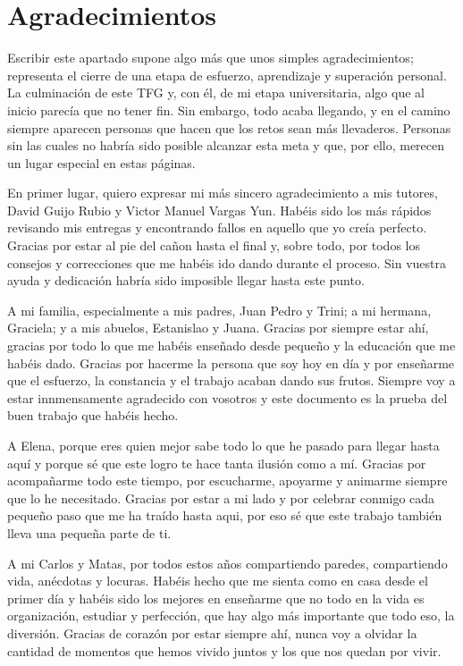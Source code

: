 \newpage
\section*{Agradecimientos}
\vspace{1cm}

Escribir este apartado supone algo más que unos simples agradecimientos; representa el cierre de una etapa de esfuerzo, aprendizaje y superación personal. La culminación de este TFG y, con él, de mi etapa universitaria, algo que al inicio parecía que no tener fin. Sin embargo, todo acaba llegando, y en el camino siempre aparecen personas que hacen que los retos sean más llevaderos. Personas sin las cuales no habría sido posible alcanzar esta meta y que, por ello, merecen un lugar especial en estas páginas.

En primer lugar, quiero expresar mi más sincero agradecimiento a mis tutores, David Guijo Rubio y Victor Manuel Vargas Yun. Habéis sido los más rápidos revisando mis entregas y encontrando fallos en aquello que yo creía perfecto. Gracias por estar al pie del cañon hasta el final y, sobre todo, por todos los consejos y correcciones que me habéis ido dando durante el proceso. Sin vuestra ayuda y dedicación habría sido imposible llegar hasta este punto.

A mi familia, especialmente a mis padres, Juan Pedro y Trini; a mi hermana, Graciela; y a mis abuelos, Estanislao y Juana. Gracias por siempre estar ahí, gracias por todo lo que me habéis enseñado desde pequeño y la educación que me habéis dado. Gracias por hacerme la persona que soy hoy en día y por enseñarme que el esfuerzo, la constancia y el trabajo acaban dando sus frutos. Siempre voy a estar innmensamente agradecido con vosotros y este documento es la prueba del buen trabajo que habéis hecho.

A Elena, porque eres quien mejor sabe todo lo que he pasado para llegar hasta aquí y porque sé que este logro te hace tanta ilusión como a mí. Gracias por acompañarme todo este tiempo, por escucharme, apoyarme y animarme siempre que lo he necesitado. Gracias por estar a mi lado y por celebrar conmigo cada pequeño paso que me ha traído hasta aqui, por eso sé que este trabajo también lleva una pequeña parte de ti.

A mi Carlos y Matas, por todos estos años compartiendo paredes, compartiendo vida, anécdotas y locuras. Habéis hecho que me sienta como en casa desde el primer día y habéis sido los mejores en enseñarme que no todo en la vida es organización, estudiar y perfección, que hay algo más importante que todo eso, la diversión. Gracias de corazón por estar siempre ahí, nunca voy a olvidar la cantidad de momentos que hemos vivido juntos y los que nos quedan por vivir.  

